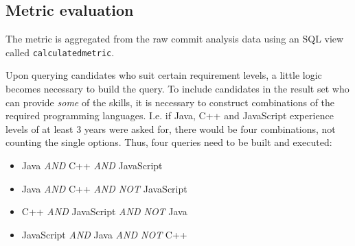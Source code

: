 \subsection{Metric evaluation}
The metric is aggregated from the raw commit analysis data using an SQL view called \verb=calculatedmetric=.



Upon querying candidates who suit certain requirement levels, a little logic becomes necessary to build the query. To include candidates in the result set who can provide \textit{some} of the skills, it is necessary to construct combinations of the required programming languages. I.e. if Java, C++ and JavaScript experience levels of at least 3 years were asked for, there would be four combinations, not counting the single options. Thus, four queries need to be built and executed:

\begin{itemize}
  \item Java \textit{AND} C++ \textit{AND} JavaScript
  \item Java \textit{AND} C++ \textit{AND NOT} JavaScript
  \item C++ \textit{AND} JavaScript \textit{AND NOT} Java
  \item JavaScript \textit{AND} Java \textit{AND NOT} C++
\end{itemize}

